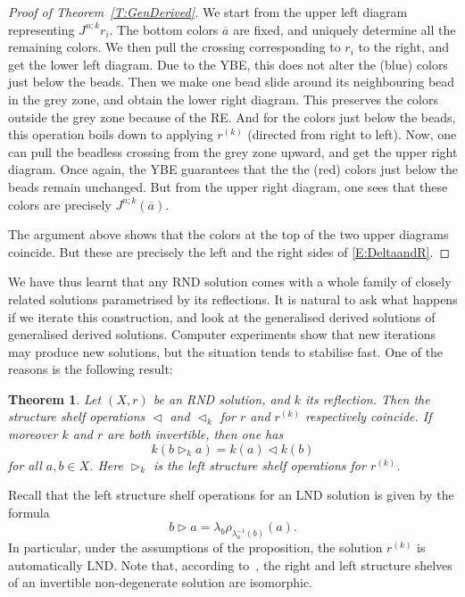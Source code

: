 \documentclass{amsart}
\newcommand\op{\mathrel{\triangleleft}}
\newcommand\lop{\mathrel{\triangleright}}
\theoremstyle{plain}
\newtheorem{thm}{Theorem}[section]
\theoremstyle{definition}
\theoremstyle{remark}
\begin{document}
\begin{proof}[Proof of Theorem~\ref{T:GenDerived}]
We start from the upper left diagram representing $J^{n;k}r_i$. The bottom colors $\overline{a}$ are fixed, and uniquely determine all the remaining colors.  We then pull the crossing corresponding to $r_i$ to the right, and get the lower left diagram. Due to the YBE, this does not alter the (blue) colors just below the beads. Then we make one bead slide around its neighbouring bead in the grey zone, and obtain the lower right diagram. This preserves the colors outside the grey zone because of the RE. And for the colors just below the beads, this operation boils down to applying $r^{(k)}$ (directed from right to left). Now, one can pull the beadless crossing from the grey zone upward, and get the upper right diagram. Once again, the YBE guarantees that the the (red) colors just below the beads remain unchanged. But from the upper right diagram, one sees that these colors are precisely $J^{n;k}(\overline{a})$.

The argument above shows that the colors at the top of the two upper diagrams coincide. But these are precisely the left and the right sides of
\eqref{E:DeltaandR}.
\end{proof}

We have thus learnt that any RND solution comes with a whole family of closely related solutions parametrised by its reflections. It is natural to ask what happens if we iterate this construction, and look at the generalised derived solutions of generalised derived solutions. Computer experiments show that new iterations may produce new solutions, but the situation tends to stabilise fast. One of the reasons is the following result:

\begin{thm}\label{T:StrShelf}
Let $(X,r)$ be an RND solution, and $k$ its reflection. Then the structure shelf operations $\op$ and $\op_k$ for $r$ and $r^{(k)}$ respectively coincide. If moreover $k$ and $r$ are both invertible, then one has 
\[k(b \lop_k a)=k(a) \op k(b)\] 
for all $a,b \in X$. Here $\lop_k$ is the left structure shelf operations for $r^{(k)}$.
\end{thm}

Recall that the left structure shelf operations for an LND solution is given by the formula
\[b \lop a = \lambda_b \rho_{\lambda_a^{-1}(b)}(a).\]
In particular, under the assumptions of the proposition, the solution $r^{(k)}$ is automatically LND. Note that, according to~\cite{LV_StrGroups}, the right and left structure shelves of an invertible non-degenerate solution are isomorphic.
\end{document}
